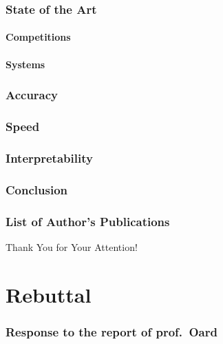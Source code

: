 \section{State of the Art}
\subsection{Competitions}
\begin{frame}[fragile]{\secname}
\end{frame}

\subsection{Systems}
\begin{frame}{\secname}
\end{frame}

\section{Accuracy}
\section{Speed}
\section{Interpretability}
\section{Conclusion}
\section{List of Author's Publications}

\begin{frame}[plain]
\vfill
\centerline{Thank You for Your Attention!}
\vfill\vfill
\end{frame}

\part{Rebuttal}
\frame{\vfill\partpage\vfill}

\section{Response to the report of prof.\ Oard}
